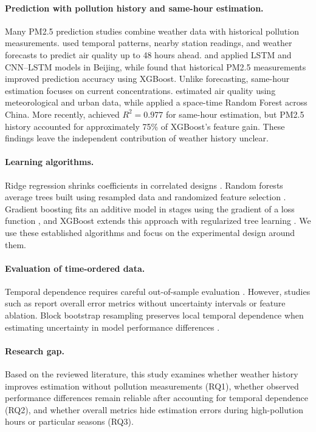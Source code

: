 \documentclass[11pt]{article}
\begin{document}
\paragraph{Prediction with pollution history and same-hour estimation.} Many PM2.5 prediction studies combine weather data with historical pollution measurements. \citet{zheng2015} used temporal patterns, nearby station readings, and weather forecasts to predict air quality up to 48 hours ahead. \citet{li2017} and \citet{huang2018} applied LSTM and CNN--LSTM models in Beijing, while \citet{joharestani2019} found that historical PM2.5 measurements improved prediction accuracy using XGBoost. Unlike forecasting, same-hour estimation focuses on current concentrations. \citet{zheng2013} estimated air quality using meteorological and urban data, while \citet{wei2019} applied a space-time Random Forest across China. More recently, \citet{wang2026} achieved $R^2=0.977$ for same-hour estimation, but PM2.5 history accounted for approximately 75\% of XGBoost's feature gain. These findings leave the independent contribution of weather history unclear.
\paragraph{Learning algorithms.}
Ridge regression shrinks coefficients in correlated designs \citep{hoerl1970}. Random forests average trees built using resampled data and randomized feature selection \citep{breiman2001}. Gradient boosting fits an additive model in stages using the gradient of a loss function \citep{friedman2001}, and XGBoost extends this approach with regularized tree learning \citep{chen2016}. We use these established algorithms and focus on the experimental design around them.
\paragraph{Evaluation of time-ordered data.}
Temporal dependence requires careful out-of-sample evaluation \citep{tashman2000,bergmeir2012}. However, studies such as \citet{garg2021} report overall error metrics without uncertainty intervals or feature ablation. Block bootstrap resampling preserves local temporal dependence when estimating uncertainty in model performance differences \citep{kunsch1989}.
\paragraph{Research gap.}
Based on the reviewed literature, this study examines whether weather history improves estimation without pollution measurements (RQ1), whether observed performance differences remain reliable after accounting for temporal dependence (RQ2), and whether overall metrics hide estimation errors during high-pollution hours or particular seasons (RQ3).
\end{document}
